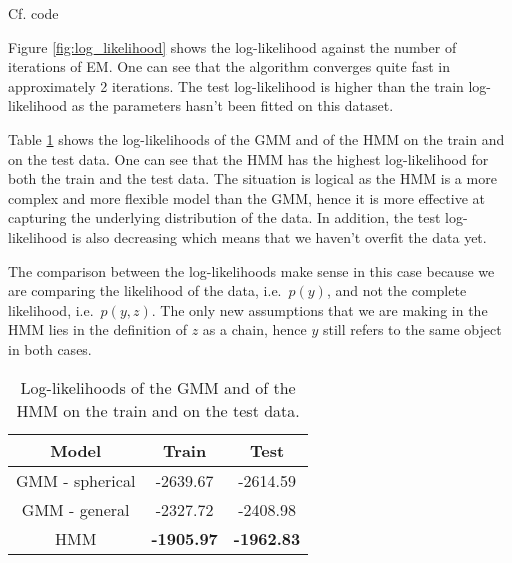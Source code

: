 \documentclass{article}
\begin{document}
Cf. code


Figure \ref{fig:log_likelihood} shows the log-likelihood against the number of iterations of EM. One can see that the algorithm converges quite fast in approximately 2 iterations. The test log-likelihood is higher than the train log-likelihood as the parameters hasn't been fitted on this dataset.



Table \ref{tb:ll} shows the log-likelihoods of the GMM and of the HMM on the train and on the test data. One can see that the HMM has the highest log-likelihood for both the train and the test data. The situation is logical as the HMM is a more complex and more flexible model than the GMM, hence it is more effective at capturing the underlying distribution of the data. In addition, the test log-likelihood is also decreasing which means that we haven't overfit the data yet.

The comparison between the log-likelihoods make sense in this case because we are comparing the likelihood of the data, i.e.~$p(y)$, and not the complete likelihood, i.e.~$p(y, z)$. The only new assumptions that we are making in the HMM lies in the definition of $z$ as a chain, hence $y$ still refers to the same object in both cases. 

\begin{table}
\centering
\begin{tabular}{|c|c|c|}
\hline
Model & Train & Test\\
\hline
GMM - spherical & -2639.67 & -2614.59 \\
\hline
GMM - general & -2327.72 & -2408.98 \\
\hline
HMM & \textbf{-1905.97} & \textbf{-1962.83} \\
\hline
\end{tabular}
\caption{Log-likelihoods of the GMM and of the HMM on the train and on the test data.}
\label{tb:ll}
\end{table}
\end{document}
